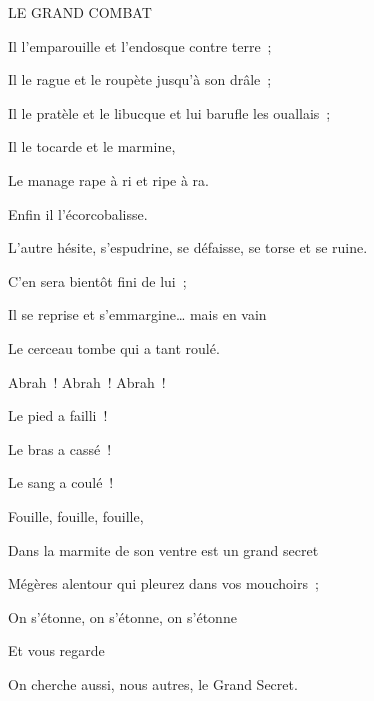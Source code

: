 
{\setlength{\parskip}{0pt}
{\begin{center} LE GRAND COMBAT\end{center}}

\bigskip

Il l'emparouille et l'endosque contre terre~;

Il le rague et le roupète jusqu'à son drâle~;

Il le pratèle et le libucque et lui barufle les ouallais~;

Il le tocarde et le marmine,

Le manage rape à ri et ripe à ra.

Enfin il l'écorcobalisse.

L'autre hésite, s'espudrine, se défaisse, se torse et se ruine.

C'en sera bientôt fini de lui~;

Il se reprise et s'emmargine… mais en vain

Le cerceau tombe qui a tant roulé.

Abrah~! Abrah~! Abrah~!

Le pied a failli~!

Le bras a cassé~!

Le sang a coulé~!

Fouille, fouille, fouille,

Dans la marmite de son ventre est un grand secret

Mégères alentour qui pleurez dans vos mouchoirs~;

On s'étonne, on s'étonne, on s'étonne

Et vous regarde

On cherche aussi, nous autres, le Grand Secret.

\setlength{\parskip}{6pt}
}


